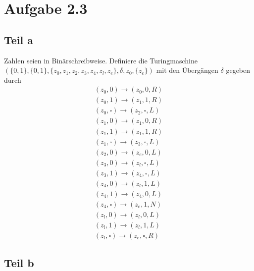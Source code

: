 \documentclass[10pt,a4paper]{article}
\begin{document}
\section{Aufgabe 2.3}

\subsection{Teil a}

Zahlen seien in Binärschreibweise.
Definiere die Turingmaschine $(\{ 0, 1 \}, \{ 0, 1 \}, \{ z_{0}, z_{1}, z_{2}, z_{3}, z_{4}, z_{l}, z_{e} \}, \delta, z_{0}, \{ z_{e} \})$ mit den Übergängen $\delta$ gegeben durch
\begin{align*}
  (z_{0}, 0) \rightarrow (z_{0}, 0, R)\\
  (z_{0}, 1) \rightarrow (z_{1}, 1, R)\\
  (z_{0}, \square) \rightarrow (z_{2}, \square, L)\\
  (z_{1}, 0) \rightarrow (z_{1}, 0, R)\\
  (z_{1}, 1) \rightarrow (z_{1}, 1, R)\\
  (z_{1}, \square) \rightarrow (z_{3}, \square, L)\\
  (z_{2}, 0) \rightarrow (z_{e}, 0, L)\\
  (z_{3}, 0) \rightarrow (z_{l}, \square, L)\\
  (z_{3}, 1) \rightarrow (z_{4}, \square, L)\\
  (z_{4}, 0) \rightarrow (z_{l}, 1, L)\\
  (z_{4}, 1) \rightarrow (z_{4}, 0, L)\\
  (z_{4}, \square) \rightarrow (z_{e}, 1, N)\\
  (z_{l}, 0) \rightarrow (z_{l}, 0, L)\\
  (z_{l}, 1) \rightarrow (z_{l}, 1, L)\\
  (z_{l}, \square) \rightarrow (z_{e}, \square, R)
\end{align*}

\subsection{Teil b}
\end{document}
